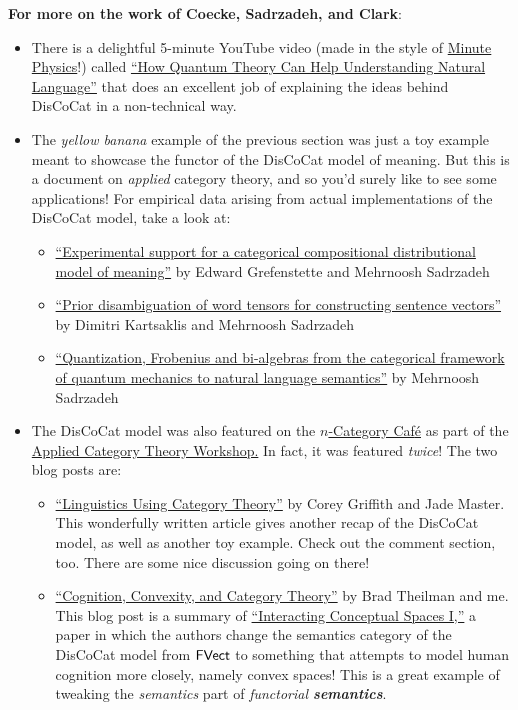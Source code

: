 \documentclass{tufte-handout-tai}
\newcommand{\cat}[1]{{\normalfont\textsf{#1}}}
\theoremstyle{plain}
\theoremstyle{definition}
\theoremstyle{remark}
\begin{document}
\newpage
\textbf{For more on the work of Coecke, Sadrzadeh, and Clark}:
\begin{itemize}
	\item There is a delightful 5-minute YouTube video (made in the style of \href{https://www.youtube.com/user/minutephysics}{Minute Physics}!) called \href{https://www.youtube.com/watch?v=99keybEZN4g}{``How Quantum Theory Can Help Understanding Natural Language''} that does an excellent job of explaining the ideas behind DisCoCat in a non-technical way.

	\item The \textit{yellow banana} example of the previous section was just a toy example meant to showcase the functor of the DisCoCat model of meaning. But this is a document on \textit{applied} category theory, and so you'd surely like to see some applications! For empirical data arising from actual implementations of the DisCoCat model, take a look at:
		\begin{itemize}
			\item \href{http://www.aclweb.org/anthology/D11-1129}{``Experimental support for a categorical compositional distributional model of meaning''} by Edward Grefenstette and Mehrnoosh Sadrzadeh 
			\item \href{https://www.cs.ox.ac.uk/files/5725/karts_sadr_emnlp.pdf}{``Prior disambiguation of word tensors for constructing sentence vectors''} by Dimitri Kartsaklis and Mehrnoosh Sadrzadeh
			\item \href{https://www.frontiersin.org/articles/10.3389/fphy.2017.00018/full}{``Quantization, Frobenius and bi-algebras from the categorical framework of quantum mechanics to natural language semantics''} by Mehrnoosh Sadrzadeh
		\end{itemize}


	\item The DisCoCat model was also featured on the \href{https://golem.ph.utexas.edu/category/}{$n$-Category Caf{\'e}} as part of the \href{http://www.appliedcategorytheory.org/school/}{Applied Category Theory Workshop.} In fact, it was featured \textit{twice}! The two blog posts are:
		\begin{itemize}
			\item \href{https://golem.ph.utexas.edu/category/2018/02/linguistics_using_category_the.html}{``Linguistics Using Category Theory''} by Corey Griffith and Jade Master. This wonderfully written article gives another recap of the DisCoCat model, as well as another toy example. Check out the comment section, too. There are some nice discussion going on there!
			\item \href{https://golem.ph.utexas.edu/category/2018/03/cognition_convexity_and_catego.html}{``Cognition, Convexity, and Category Theory''} by Brad Theilman and me. This blog post is a summary of \href{https://arxiv.org/pdf/1703.08314.pdf}{``Interacting Conceptual Spaces I,''} a paper in which the authors change the semantics category of the DisCoCat model from $\cat{FVect}$ to something that attempts to model human cognition more closely, namely convex spaces! This is a great example of tweaking the \textit{semantics} part of \textit{functorial \textbf{semantics}}.
		\end{itemize}


\end{itemize}
\end{document}
